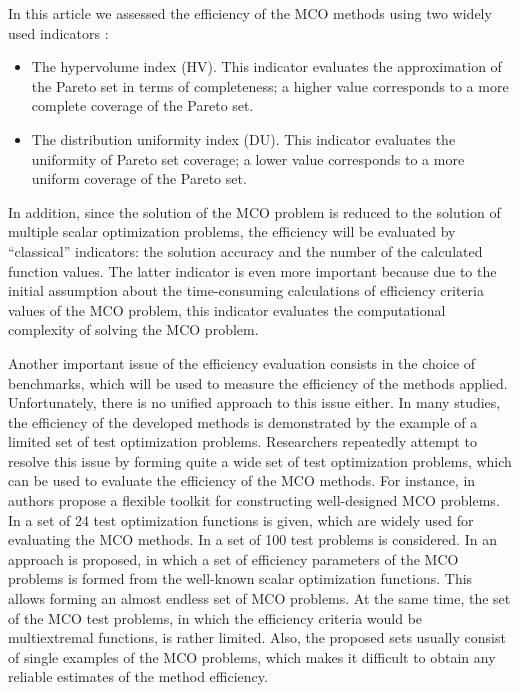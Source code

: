 \documentclass[smallextended]{svjour3}       %
\begin{document}
In this article we assessed the efficiency of the MCO methods using two widely used indicators \cite{c35,c36}:
\begin{itemize}
	\item The hypervolume index (HV). This indicator evaluates the approximation of the Pareto set in terms of completeness; a higher value corresponds to a more complete coverage of the Pareto set.
	\item The distribution uniformity index (DU). This indicator evaluates the uniformity of Pareto set coverage; a lower value corresponds to a more uniform coverage of the Pareto set.
\end{itemize}

In addition, since the solution of the MCO problem is reduced to the solution of multiple scalar optimization problems, the efficiency will be evaluated by ``classical'' indicators: the solution accuracy and the number of the calculated function values. The latter indicator is even more important because due to the initial assumption about the time-consuming calculations of efficiency criteria values of the MCO problem, this indicator evaluates the computational complexity of solving the MCO problem.

Another important issue of the efficiency evaluation consists in the choice of benchmarks, which will be used to measure the efficiency of the methods applied. Unfortunately, there is no unified approach to this issue either. In many studies, the efficiency of the developed methods is demonstrated by the example of a limited set of test optimization problems. Researchers repeatedly attempt to resolve this issue by forming quite a wide set of test optimization problems, which can be used to evaluate the efficiency of the MCO methods. For instance, in \cite{c53} authors propose a flexible toolkit for constructing well-designed MCO problems. In \cite{c54} a set of 24 test optimization functions is given, which are widely used for evaluating the MCO methods. In \cite{c55} a set of 100 test problems is considered. In \cite{c56} an approach is proposed, in which a set of efficiency parameters of the MCO problems is formed from the well-known scalar optimization functions. This allows forming an almost endless set of MCO problems. At the same time, the set of the MCO test problems, in which the efficiency criteria would be multiextremal functions, is rather limited. Also, the proposed sets usually consist of single examples of the MCO problems, which makes it difficult to obtain any reliable estimates of the method efficiency. 
\end{document}
